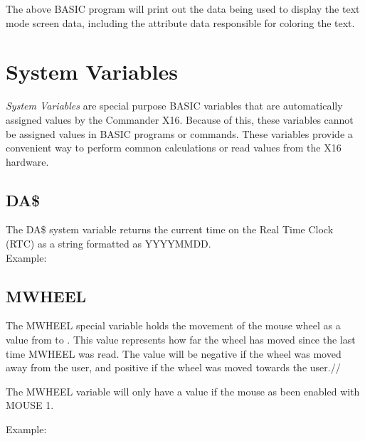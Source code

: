 The above BASIC program will print out the data being used to display the text
mode screen data, including the attribute data responsible for coloring the
text.\\

\section{System Variables}

\emph{System Variables} are special purpose BASIC variables that are
automatically assigned values by the Commander X16.  Because of this, these
variables cannot be assigned values in BASIC programs or commands.  These
variables provide a convenient way to perform common calculations or read
values from the X16 hardware.\\

\subsection{DA\$}

The {\ttfamily DA\$} system variable returns the current time on the Real Time
Clock (RTC) as a string formatted as YYYYMMDD.\\

Example:\\


\subsection{MWHEEL}

The {\ttfamily MWHEEL} special variable holds the movement of the mouse wheel
as a value from {} to {}.  This value represents how
far the wheel has moved since the last time {\ttfamily MWHEEL} was read.  The
value will be negative if the wheel was moved away from the user, and positive
if the wheel was moved towards the user.//

The {\ttfamily MWHEEL} variable will only have a value if the mouse as been
enabled with {\ttfamily MOUSE 1}.

Example:\\


